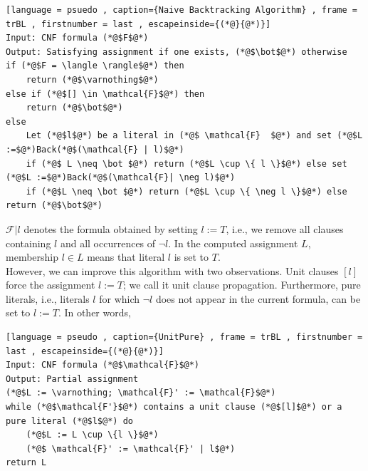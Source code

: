 \documentclass[a4paper]{article}
\theoremstyle{plain}
\theoremstyle{definition}
\newtheorem{defn}{Definition}[section]
\theoremstyle{remark}
\begin{document}
\begin{tcolorbox}[colback=black!3!white,colframe=black!60!white,title=\begin{defn}Naive Backtracking Algorithm \label{Naive Backtracking Algorithm}\end{defn}]
\begin{lstlisting}[language = psuedo , caption={Naive Backtracking Algorithm} , frame = trBL , firstnumber = last , escapeinside={(*@}{@*)}]
Input: CNF formula (*@$F$@*)
Output: Satisfying assignment if one exists, (*@$\bot$@*) otherwise
if (*@$F = \langle \rangle$@*) then
	return (*@$\varnothing$@*)	
else if (*@$[] \in \mathcal{F}$@*) then
	return (*@$\bot$@*)
else
	Let (*@$l$@*) be a literal in (*@$ \mathcal{F}	$@*) and set (*@$L :=$@*)Back(*@$(\mathcal{F} | l)$@*)
	if (*@$ L \neq \bot $@*) return (*@$L \cup \{ l \}$@*) else set (*@$L :=$@*)Back(*@$(\mathcal{F}| \neg l)$@*)
	if (*@$L \neq \bot $@*) return (*@$L \cup \{ \neg l \}$@*) else return (*@$\bot$@*)
\end{lstlisting}
$\mathcal{F} | l$ denotes the formula obtained by setting $l := T$, i.e., we remove all clauses containing $l$ and all occurrences of $\neg l$. In the computed assignment $L$, membership $l \in L$ means that literal $l$ is set to $T$.\\
However, we can improve this algorithm with two observations. Unit clauses $[l]$ force the assignment $l := T$; we call it unit clause propagation. Furthermore, pure literals, i.e., literals $l$ for which $\neg l$ does not appear in the current formula, can be set to $l := T$. In other words,
\begin{lstlisting}[language = pseudo , caption={UnitPure} , frame = trBL , firstnumber = last , escapeinside={(*@}{@*)}]
Input: CNF formula (*@$\mathcal{F}$@*)
Output: Partial assignment
(*@$L := \varnothing; \mathcal{F}' := \mathcal{F}$@*)
while (*@$\mathcal{F'}$@*) contains a unit clause (*@$[l]$@*) or a pure literal (*@$l$@*) do
	(*@$L := L \cup \{l \}$@*)
	(*@$ \mathcal{F}' := \mathcal{F}' | l$@*)
return L
\end{lstlisting}
\end{tcolorbox}
\end{document}
